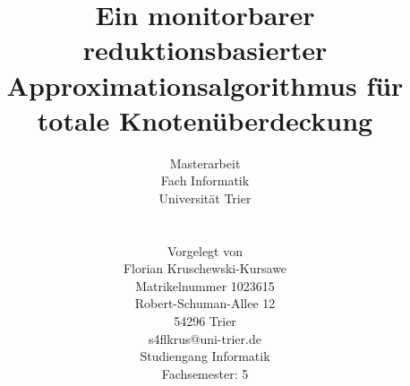 \documentclass[12pt,onecolumn, notitlepage]{scrartcl}
\begin{document}
 

\begin{titlepage}
\title{Ein monitorbarer reduktionsbasierter Approximationsalgorithmus für totale Knotenüberdeckung}

\author{Masterarbeit \\ Fach Informatik \\ Universität Trier \\ \\ \\
Vorgelegt von \\ Florian Kruschewski-Kursawe \\ Matrikelnummer 1023615 \\ 
Robert-Schuman-Allee 12 \\ 54296 Trier \\ s4flkrus@uni-trier.de \\ Studiengang Informatik \\ Fachsemester: 5 \\ \\ \\ \\ \\}

\date{}

\publishers{
  {1. Prüfer: Univ.-Prof. Dr. Henning Fernau } \\
  {2. Prüfer: Univ.-Prof. Dr. Stefan Näher }\\
  {Eingereicht am: 13.02.2019}
}


\end{titlepage} 

\lstset{language=C++}

\newtheorem{defi}{Definition:}
\newtheorem{sat}{Satz:} 
\newtheorem{auf}{Lemma:}
\newtheorem{cor}{Korollar:} 

\renewcommand{\thedefi}{\hspace{-0.5em}}
\renewcommand{\thesat}{\hspace{-0.5em}}
\renewcommand{\thecor}{\hspace{-0.5em}}
\renewcommand{\theauf}{\hspace{-0.5em}}

\maketitle

\newpage

\tableofcontents

\newpage

\begin{abstract}


\end{abstract}
\end{document}
